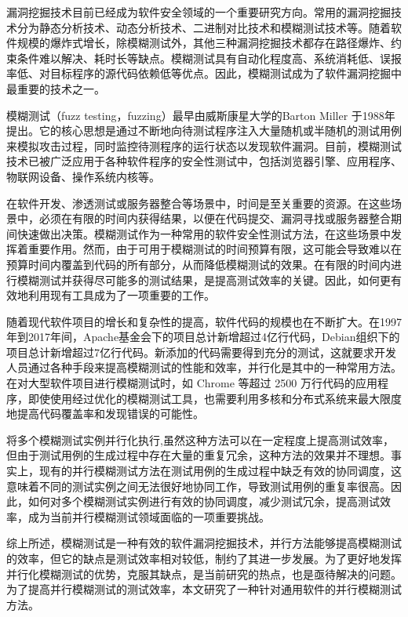 \documentclass[master]{thesis-uestc}
\begin{document}
漏洞挖掘技术目前已经成为软件安全领域的一个重要研究方向。常用的漏洞挖掘技术分为静态分析技术、动态分析技术、二进制对比技术和模糊测试技术等。随着软件规模的爆炸式增长，除模糊测试外，其他三种漏洞挖掘技术都存在路径爆炸、约束条件难以解决、耗时长等缺点。模糊测试具有自动化程度高、系统消耗低、误报率低、对目标程序的源代码依赖低等优点。因此，模糊测试成为了软件漏洞挖掘中最重要的技术之一。

模糊测试（fuzz testing，fuzzing）最早由威斯康星大学的Barton Miller 于1988年提出。它的核心思想是通过不断地向待测试程序注入大量随机或半随机的测试用例来模拟攻击过程，同时监控待测程序的运行状态以发现软件漏洞。目前，模糊测试技术已被广泛应用于各种软件程序的安全性测试中，包括浏览器引擎、应用程序、物联网设备、操作系统内核等。

在软件开发、渗透测试或服务器整合等场景中，时间是至关重要的资源。在这些场景中，必须在有限的时间内获得结果，以便在代码提交、漏洞寻找或服务器整合期间快速做出决策。模糊测试作为一种常用的软件安全性测试方法，在这些场景中发挥着重要作用。然而，由于可用于模糊测试的时间预算有限，这可能会导致难以在预算时间内覆盖到代码的所有部分，从而降低模糊测试的效果。在有限的时间内进行模糊测试并获得尽可能多的测试结果，是提高测试效率的关键。因此，如何更有效地利用现有工具成为了一项重要的工作。

随着现代软件项目的增长和复杂性的提高，软件代码的规模也在不断扩大。在1997年到2017年间，Apache基金会下的项目总计新增超过4亿行代码，Debian组织下的项目总计新增超过7亿行代码。新添加的代码需要得到充分的测试，这就要求开发人员通过各种手段来提高模糊测试的性能和效率，并行化是其中的一种常用方法。在对大型软件项目进行模糊测试时，如 Chrome 等超过 2500 万行代码的应用程序，即使使用经过优化的模糊测试工具，也需要利用多核和分布式系统来最大限度地提高代码覆盖率和发现错误的可能性。

将多个模糊测试实例并行化执行,虽然这种方法可以在一定程度上提高测试效率，但由于测试用例的生成过程中存在大量的重复冗余，这种方法的效果并不理想。事实上，现有的并行模糊测试方法在测试用例的生成过程中缺乏有效的协同调度，这意味着不同的测试实例之间无法很好地协同工作，导致测试用例的重复率很高。因此，如何对多个模糊测试实例进行有效的协同调度，减少测试冗余，提高测试效率，成为当前并行模糊测试领域面临的一项重要挑战。

综上所述，模糊测试是一种有效的软件漏洞挖掘技术，并行方法能够提高模糊测试的效率，但它的缺点是测试效率相对较低，制约了其进一步发展。为了更好地发挥并行化模糊测试的优势，克服其缺点，是当前研究的热点，也是亟待解决的问题。为了提高并行模糊测试的测试效率，本文研究了一种针对通用软件的并行模糊测试方法。
\end{document}

